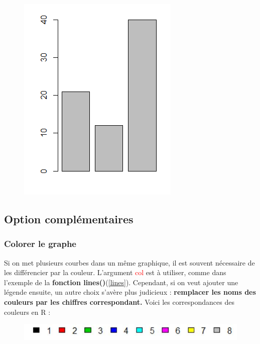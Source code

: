 \documentclass{article}
\newcommand{\argument}[1]{\textcolor{red}{#1}}
\begin{document}
\begin{figure}[!h]
    \centering
    \includegraphics[scale = 0.5]{barre.PNG}
\end{figure}

\subsection{Option complémentaires}
\subsubsection{Colorer le graphe}\label{coloration}
Si on met plusieurs courbes dans un même graphique, il est souvent nécessaire de les différencier par la couleur. L'argument \argument{col} est à utiliser, comme dans l'exemple de la \textbf{fonction lines()}(\ref{lines}). Cependant, si on veut ajouter une légende ensuite, un autre choix s'avère plus judicieux : \textbf{remplacer les noms des couleurs par les chiffres correspondant.} Voici les correspondances des couleurs en R : 

\begin{figure}[!h]
    \centering
    \includegraphics{palette.JPG}
    \label{fig:couleurs}
\end{figure}
\end{document}
